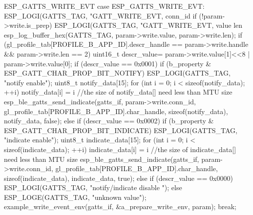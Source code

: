 \documentclass[lang=cn,newtx,10pt,scheme=chinese]{elegantbook}
\begin{document}
\begin{mycode}{ESP\_GATTS\_WRITE\_EVT}
case ESP_GATTS_WRITE_EVT: {                          
     ESP_LOGI(GATTS_TAG, "GATT_WRITE_EVT, conn_id %
     if (!param->write.is_prep){
        ESP_LOGI(GATTS_TAG, "GATT_WRITE_EVT, value len %
        esp_log_buffer_hex(GATTS_TAG, param->write.value, param->write.len);
        if (gl_profile_tab[PROFILE_B_APP_ID].descr_handle == param->write.handle && param->write.len == 2){
            uint16_t descr_value= param->write.value[1]<<8 | param->write.value[0];
            if (descr_value == 0x0001){
                if (b_property & ESP_GATT_CHAR_PROP_BIT_NOTIFY){
                    ESP_LOGI(GATTS_TAG, "notify enable");
                    uint8_t notify_data[15];
                    for (int i = 0; i < sizeof(notify_data); ++i)
                    {
                         notify_data[i] = i%
                     }
                     //the size of notify_data[] need less than MTU size
                     esp_ble_gatts_send_indicate(gatts_if, param->write.conn_id,  
                                                 gl_profile_tab[PROFILE_B_APP_ID].char_handle,  
                                                 sizeof(notify_data),  
                                                 notify_data, false);
                }
            }else if (descr_value == 0x0002){
                 if (b_property & ESP_GATT_CHAR_PROP_BIT_INDICATE){
                     ESP_LOGI(GATTS_TAG, "indicate enable");
                     uint8_t indicate_data[15];
                     for (int i = 0; i < sizeof(indicate_data); ++i)
                     {
                         indicate_data[i] = i %
                      }
                      //the size of indicate_data[] need less than MTU size
                     esp_ble_gatts_send_indicate(gatts_if, param->write.conn_id,  
                                                 gl_profile_tab[PROFILE_B_APP_ID].char_handle,  
                                                 sizeof(indicate_data),  
                                                 indicate_data, true);
                }
             }
             else if (descr_value == 0x0000){
                 ESP_LOGI(GATTS_TAG, "notify/indicate disable ");
             }else{
                 ESP_LOGE(GATTS_TAG, "unknown value");
             }
        }
    }
    example_write_event_env(gatts_if, &a_prepare_write_env, param);
    break;
}
\end{mycode}
\end{document}

